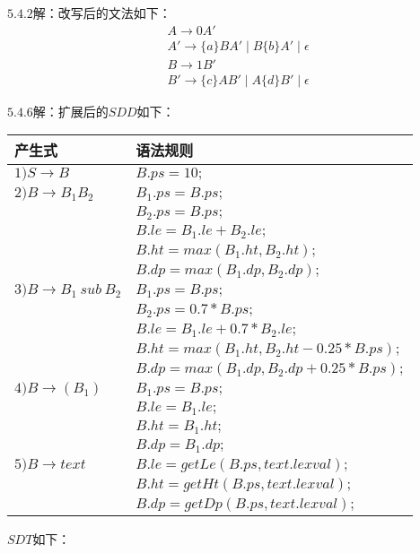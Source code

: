 \documentclass[UTF8,noindent]{ctexart}
\begin{document}
$5.4.2$解：改写后的文法如下：
\begin{align*}
  & A\rightarrow 0A'\\
  & A'\rightarrow \{a\}BA'\mid B\{b\}A'\mid \epsilon\\
  & B\rightarrow 1B'\\
  & B'\rightarrow \{c\}AB'\mid A\{d\}B'\mid \epsilon
\end{align*}

$5.4.6$解：扩展后的$SDD$如下：
\begin{center}
  \begin{tabular}{|l|l|}
	\hline
	产生式 & 语法规则\\
	\hline
  $1)S\rightarrow B$ & $B.ps = 10;$\\
\hline
$2)B\rightarrow B_1 B_2$ & $B_1.ps = B.ps;$\\
& $B_2.ps = B.ps;$\\
& $ B.le = B_1.le + B_2.le;$\\
& $B.ht = max(B_1.ht, B_2.ht);$\\
& $B.dp = max(B_1.dp, B_2.dp);$\\
\hline
$3)B\rightarrow B_1\ sub \ B_2$ & $B_1.ps = B.ps;$\\
& $B_2.ps = 0.7*B.ps;$\\
& $B.le = B_1.le + 0.7 * B_2.le;$\\
& $B.ht = max(B_1.ht, B_2.ht - 0.25* B.ps);$\\
& $B.dp = max(B_1.dp, B_2.dp + 0.25* B.ps);$\\
\hline
$4)B\rightarrow (B_1)$ & $B_1.ps = B.ps;$\\
& $B.le = B_1.le;$\\
& $B.ht = B_1.ht;$\\
& $B.dp = B_1.dp;$\\
\hline
$5)B\rightarrow text $ & $B.le = getLe(B.ps, text.lexval);$\\
& $B.ht = getHt(B.ps, text.lexval);$\\
& $B.dp = getDp(B.ps, text.lexval);$\\
\hline
  \end{tabular}
  \end{center}
%
$SDT$如下：
\end{document}
